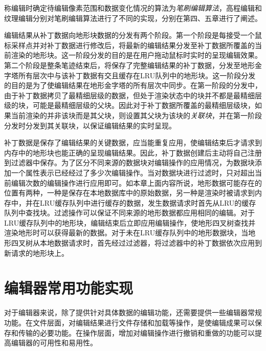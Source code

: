 称编辑时确定待编辑像素范围和数据变化情况的算法为\textit{笔刷编辑算法}，高程编辑和纹理编辑分别对笔刷编辑算法进行了不同的实现，分别在第四、五章进行了阐述。\par
编辑结果从补丁数据向地形块数据的分发有两个阶段。第一个阶段是每接受一个鼠标采样点并对补丁数据进行修改后，将最新的编辑结果分发至补丁数据所覆盖的当前渲染的地形块。这一阶段分发的目的是在用户拖动鼠标时实时的呈现编辑效果。第二个阶段是整条笔迹结束后，将保存了完整编辑结果的补丁数据，分发至地形金字塔所有层次中与该补丁数据有交且缓存在LRU队列中的地形块。这一阶段分发的目的是为了使编辑结果在地形金字塔的所有层次中同步。在第一阶段的分发中，由于补丁数据拷贝了最精细层级的数据，但处于渲染状态中的块并不都是最精细层级的块，可能是最精细层级的父块。因此对于补丁数据所覆盖的最精细层级块，如果当前渲染的并非该块而是其父块，则设置其父块为该块的\textit{关联块}，并在第一阶段分发时分发到其关联块，以保证编辑结果的实时呈现。\par

补丁数据是保存了编辑结果的关键数据，应当能重复应用，使编辑结束后才请求到内存中的地形块也能正确的呈现编辑结果。因此，补丁数据创建后主动将自己注册到过滤器中保存。为了区分不同来源的数据块对编辑操作的应用情况，为数据块添加一个属性表示已经经过了多少次编辑操作。当对数据块进行过滤时，只对超出当前编辑次数的编辑操作进行应用即可。如本章上面内容所说，地形数据可能存在的位置有两种，一种是保存在本地数据库中的原始数据，另一种是渲染时被请求到内存中，并在LRU缓存队列中进行缓存的数据，发生数据请求时首先从LRU的缓存队列中查找块。过滤操作可以保证不同来源的地形数据都应用相同的编辑。对于LRU缓存队列中的地形块，编辑结束后立即应用编辑操作，使地形四叉树查找并渲染地形时可以获得最新的数据。对于未在LRU缓存队列中的地形数据块，当地形四叉树从本地数据请求时，首先经过过滤器，将过滤器中的补丁数据依次应用到新请求的地形块上。\par

\section{编辑器常用功能实现}
对于编辑器来说，除了提供针对具体数据的编辑功能，还需要提供一些编辑器常规功能。在文件层面，对编辑结果进行文件存储和加载等操作，是使编辑成果可以保存和传输的必要功能。在操作层面，增加对编辑操作进行撤销和重做的功能可以提高编辑器的可用性和易用性。

